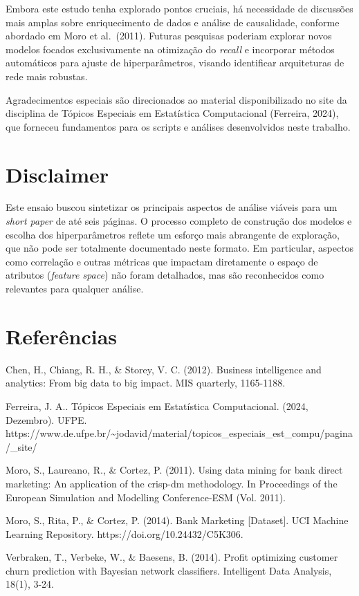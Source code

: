 \documentclass[
  onecolumn]{article}
\begin{document}
Embora este estudo tenha explorado pontos cruciais, há necessidade de
discussões mais amplas sobre enriquecimento de dados e análise de
causalidade, conforme abordado em Moro et al.~(2011). Futuras pesquisas
poderiam explorar novos modelos focados exclusivamente na otimização do
\emph{recall} e incorporar métodos automáticos para ajuste de
hiperparâmetros, visando identificar arquiteturas de rede mais robustas.

Agradecimentos especiais são direcionados ao material disponibilizado no
site da disciplina de Tópicos Especiais em Estatística Computacional
(Ferreira, 2024), que forneceu fundamentos para os scripts e análises
desenvolvidos neste trabalho.

\section{Disclaimer}\label{disclaimer}

Este ensaio buscou sintetizar os principais aspectos de análise viáveis
para um \emph{short paper} de até seis páginas. O processo completo de
construção dos modelos e escolha dos hiperparâmetros reflete um esforço
mais abrangente de exploração, que não pode ser totalmente documentado
neste formato. Em particular, aspectos como correlação e outras métricas
que impactam diretamente o espaço de atributos (\emph{feature space})
não foram detalhados, mas são reconhecidos como relevantes para qualquer
análise.

\section{Referências}\label{referuxeancias}

Chen, H., Chiang, R. H., \& Storey, V. C. (2012). Business intelligence
and analytics: From big data to big impact. MIS quarterly, 1165-1188.

Ferreira, J. A.. Tópicos Especiais em Estatística Computacional. (2024,
Dezembro). UFPE.
https://www.de.ufpe.br/\textasciitilde jodavid/material/topicos\_especiais\_est\_compu/pagina/\_site/

Moro, S., Laureano, R., \& Cortez, P. (2011). Using data mining for bank
direct marketing: An application of the crisp-dm methodology. In
Proceedings of the European Simulation and Modelling Conference-ESM
(Vol. 2011).

Moro, S., Rita, P., \& Cortez, P. (2014). Bank Marketing {[}Dataset{]}.
UCI Machine Learning Repository. https://doi.org/10.24432/C5K306.

Verbraken, T., Verbeke, W., \& Baesens, B. (2014). Profit optimizing
customer churn prediction with Bayesian network classifiers. Intelligent
Data Analysis, 18(1), 3-24.
\end{document}
